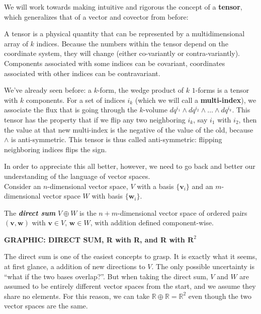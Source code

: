 	We will work towards making intuitive and rigorous the concept of a \textbf{tensor}, which generalizes that of a vector and covector from before:
	\begin{concept}[Tensor]
		A tensor is a physical quantity that can be represented by a multidimensional array of $k$ indices. Because the numbers within the tensor depend on the coordinate system, they will change (either co-variantly or contra-variantly). Components associated with some indices can be covariant, coordinates associated with other indices can be contravariant. 
	\end{concept}
	We've already seen before: a $k$-form, the wedge product of $k$ $1$-forms is a tensor with $k$ components. For a set of indices $i_k$ (which we will call a \textbf{multi-index}), we associate the flux that is going through the $k$-volume $dq^{i_1} \wedge dq^{i_2} \wedge \dots \wedge dq^{i_k}$. This tensor has the property that if we flip any two neighboring $i_k$, say $i_1$ with $i_2$, then the value at that new multi-index is the negative of the value of the old, because $\wedge$ is anti-symmetric. This tensor is thus called anti-symmetric: flipping neighboring indices flips the sign.
	
	In order to appreciate this all better, however, we need to go back and better our understanding of the language of vector spaces. \\
	
	Consider an $n$-dimensional vector space, $V$ with a basis $\{ \mathbf v_i \}$ and an $m$-dimensional vector space $W$ with basis $\{ \mathbf w_i \}$. 
	\begin{defn}
		The \emph{\textbf{direct sum}} $V \oplus W$ is the $n+m$-dimensional vector space of ordered pairs $(\mathbf v, \mathbf w)$ with $\mathbf v \in V$, $\mathbf w \in W$, with addition defined component-wise.
	\end{defn}
	
	\textbf{GRAPHIC: DIRECT SUM, R with R, and R with $\mathbf R^2$}
	
	The direct sum is one of the easiest concepts to grasp. It is exactly what it seems, at first glance, a addition of new directions to $V$. The only possible uncertainty is ``what if the two bases overlap?''. But when taking the direct sum, $V$ and $W$ are assumed to be entirely different vector spaces from the start, and we assume they share no elements. For this reason, we can take $\mathbb{R} \oplus \mathbb{R} = \mathbb{R}^2$ even though the two vector spaces are the same.
	
